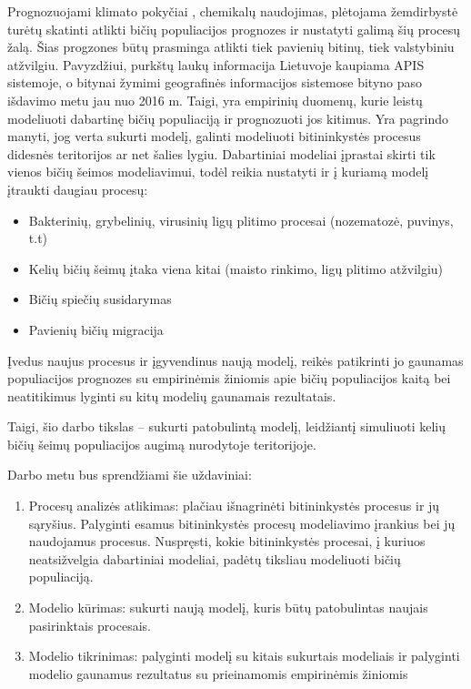 \documentclass{VUMIFKompMagistrinis}
\begin{document}
 Prognozuojami klimato pokyčiai \cite{IPC18}, chemikalų naudojimas, plėtojama žemdirbystė turėtų skatinti atlikti bičių populiacijos prognozes ir nustatyti galimą šių procesų žalą. Šias progzones būtų prasminga atlikti tiek pavienių bitinų, tiek valstybiniu atžvilgiu. Pavyzdžiui, purkštų laukų informacija Lietuvoje kaupiama APIS sistemoje, o bitynai žymimi geografinės informacijos sistemose bityno paso išdavimo metu jau nuo 2016 m. Taigi, yra empirinių duomenų, kurie leistų modeliuoti dabartinę bičių populiaciją ir prognozuoti jos kitimus. Yra pagrindo manyti, jog verta sukurti modelį, galinti modeliuoti bitininkystės procesus didesnės teritorijos ar net šalies lygiu. Dabartiniai modeliai įprastai skirti tik vienos bičių šeimos modeliavimui, todėl reikia nustatyti ir į kuriamą modelį įtraukti daugiau procesų: 
\begin{itemize}
\item Bakterinių, grybelinių, virusinių ligų plitimo procesai (nozematozė, puvinys, t.t)
\item Kelių bičių šeimų įtaka viena kitai (maisto rinkimo, ligų plitimo atžvilgiu)
\item Bičių spiečių susidarymas
\item Pavienių bičių migracija
\end{itemize}

Įvedus naujus procesus ir įgyvendinus naują modelį, reikės patikrinti jo gaunamas populiacijos prognozes su empirinėmis žiniomis apie bičių populiacijos kaitą bei neatitikimus lyginti su kitų modelių gaunamais rezultatais.



Taigi, šio darbo tikslas -- sukurti patobulintą modelį, leidžiantį simuliuoti kelių bičių šeimų populiacijos augimą nurodytoje teritorijoje.

Darbo metu bus sprendžiami šie uždaviniai:
\begin{enumerate}
    \item Procesų analizės atlikimas: plačiau išnagrinėti bitininkystės procesus ir jų sąryšius. Palyginti esamus bitininkystės procesų modeliavimo įrankius bei jų naudojamus procesus. Nuspręsti, kokie bitininkystės procesai, į kuriuos neatsižvelgia dabartiniai modeliai, padėtų tiksliau modeliuoti bičių populiaciją.
    \item  Modelio kūrimas: sukurti naują modelį, kuris būtų patobulintas naujais pasirinktais procesais.
    \item Modelio tikrinimas: palyginti modelį su kitais sukurtais modeliais ir palyginti modelio gaunamus rezultatus su prieinamomis empirinėmis žiniomis
\end{enumerate}
\end{document}
